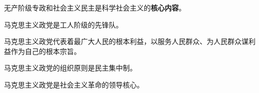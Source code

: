 无产阶级专政和社会主义民主是科学社会主义的\textbf{{核心内容}}。

马克思主义政党是工人阶级的先锋队。

马克思主义政党代表着最广大人民的根本利益，以服务人民群众、为人民群众谋利益作为自己的根本宗旨。

马克思主义政党的组织原则是民主集中制。

马克思主义政党是社会主义革命的领导核心。
